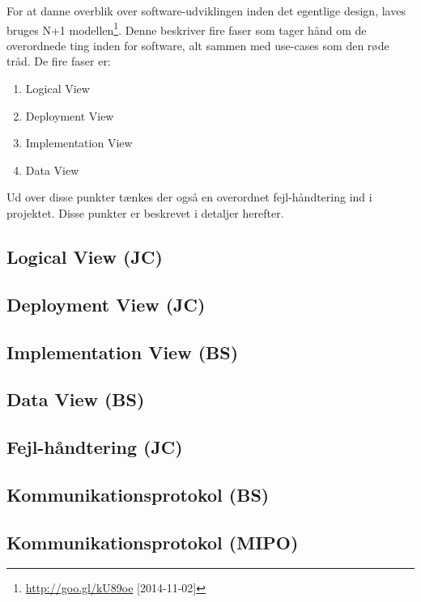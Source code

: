For at danne overblik over software-udviklingen inden det egentlige design, laves bruges N+1 modellen\footnote{\url{http://goo.gl/kU89oe} [2014-11-02]}.
Denne beskriver fire faser som tager hånd om de overordnede ting inden for software, alt sammen med use-cases som den røde tråd.
De fire faser er:

\begin{enumerate}
	\item Logical View
	\item Deployment View
	\item Implementation View
	\item Data View
\end{enumerate}

Ud over disse punkter tænkes der også en overordnet fejl-håndtering ind i projektet. Disse punkter er beskrevet i detaljer herefter.

\subsection{Logical View (JC)}


\clearpage
\subsection{Deployment View (JC)}



\subsection{Implementation View (BS)}


\subsection{Data View (BS)}


\subsection{Fejl-håndtering (JC)}


\subsection{Kommunikationsprotokol (BS)}


\subsection{Kommunikationsprotokol (MIPO)}
